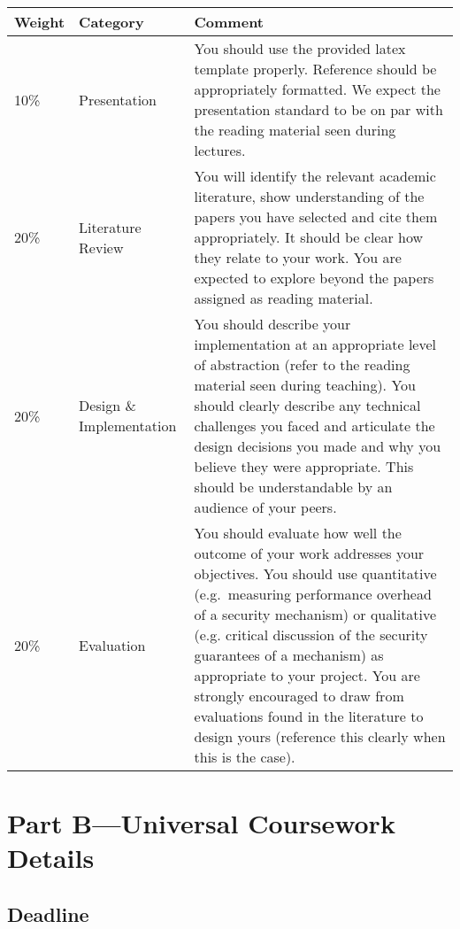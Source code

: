 \documentclass{article}
\begin{document}
\begin{tabularx}{\linewidth}{llX}
  \toprule
  Weight & Category & Comment \\
  \midrule
  10\% & Presentation & You should use the provided latex template
                        properly. Reference should be appropriately formatted. We expect the
                        presentation standard to be on par with the reading material seen during
                        lectures. \\
  20\% & Literature Review & You will identify the relevant academic
                             literature, show understanding of the papers you have selected and cite
                             them appropriately. It should be clear how they relate to your work. You
                             are expected to explore beyond the papers assigned as reading
                             material. \\
  20\% & Design \& Implementation & You should describe your
                                    implementation at an appropriate level of abstraction (refer to the
                                    reading material seen during teaching). You should clearly describe any
                                    technical challenges you faced and articulate the design decisions you
                                    made and why you believe they were appropriate. This should be
                                    understandable by an audience of your peers. \\
  20\% & Evaluation & You should evaluate how well the outcome of your
                      work addresses your objectives. You should use quantitative
                      (e.g.~measuring performance overhead of a security mechanism) or
                      qualitative (e.g. critical discussion of the security guarantees of a
                      mechanism) as appropriate to your project. You are strongly encouraged
                      to draw from evaluations found in the literature to design yours
                      (reference this clearly when this is the case). \\
  \bottomrule
\end{tabularx}

\newpage{}
\section*{Part B---Universal Coursework Details}

\subsection*{Deadline}
\end{document}
